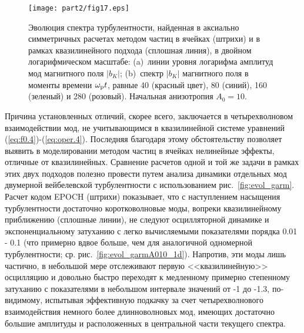 \begin{figure}[t]
\centering
\texttt{[image: part2/fig17.eps]}
\caption{Эволюция спектра турбулентности, найденная в аксиально симметричных расчетах методом частиц в ячейках (штрихи) и в рамках квазилинейного подхода (сплошная линия), в двойном логарифмическом масштабе: (a)~линии уровня логарифма амплитуд мод магнитного поля $|b_K|$; 
(b)~спектр $|b_K|$ магнитного поля в моменты времени $\omega_\mathrm{p} t$, равные 40 (красный цвет), 80 (синий), 160 (зеленый) и 280 (розовый). Начальная анизотропия $A_0=10$.
}
\label{fig:dinspectrA10_2d}
\end{figure}
Причина установленных отличий, скорее всего, заключается в четырехволновом взаимодействии мод, не учитывающимся в квазилинейной системе уравнений (\ref{eq:f0.4})-(\ref{eq:oper.4}). Последняя благодаря этому обстоятельству позволяет выявить в моделировании методом частиц в ячейках нелинейные эффекты, отличные от квазилинейных. Сравнение расчетов одной и той же задачи в рамках этих двух подходов полезно провести путем анализа динамики отдельных мод двумерной вейбелевской турбулентности с использованием рис.~\ref{fig:evol_garm}. Расчет кодом EPOCH (штрихи) показывает, что с наступлением насыщения турбулентности достаточно коротковолновые моды, вопреки квазилинейному приближению (сплошные линии), не следуют осцилляторной динамике и экспоненциальному затуханию с легко вычисляемыми показателями порядка 0.01 - 0.1 (что примерно вдвое больше, чем для аналогичной одномерной турбулентности; ср. рис.~\ref{fig:evol_garmA010_1d}). Напротив, эти моды лишь частично, в небольшой мере отслеживают первую <<квазилинейную>> осцилляцию и довольно быстро переходят к медленному примерно степенному затуханию с показателями в небольшом интервале значений от -1 до -1.3, по-видимому, испытывая эффективную подкачку за счет четырехволнового взаимодействия немного более длинноволновых мод, имеющих достаточно большие амплитуды и расположенных в центральной части текущего спектра. 

